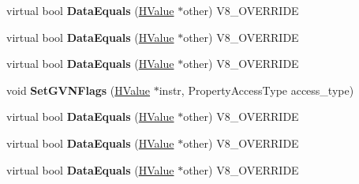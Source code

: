 \begin{DoxyCompactItemize}
\item 
\hypertarget{classv8_1_1internal_1_1_v8___f_i_n_a_l_a7f4d45af1c12067191189fb1f32db617}{}virtual bool {\bfseries Data\+Equals} (\hyperlink{classv8_1_1internal_1_1_h_value}{H\+Value} $\ast$other) V8\+\_\+\+O\+V\+E\+R\+R\+I\+D\+E\label{classv8_1_1internal_1_1_v8___f_i_n_a_l_a7f4d45af1c12067191189fb1f32db617}

\item 
\hypertarget{classv8_1_1internal_1_1_v8___f_i_n_a_l_a7f4d45af1c12067191189fb1f32db617}{}virtual bool {\bfseries Data\+Equals} (\hyperlink{classv8_1_1internal_1_1_h_value}{H\+Value} $\ast$other) V8\+\_\+\+O\+V\+E\+R\+R\+I\+D\+E\label{classv8_1_1internal_1_1_v8___f_i_n_a_l_a7f4d45af1c12067191189fb1f32db617}

\item 
\hypertarget{classv8_1_1internal_1_1_v8___f_i_n_a_l_a7f4d45af1c12067191189fb1f32db617}{}virtual bool {\bfseries Data\+Equals} (\hyperlink{classv8_1_1internal_1_1_h_value}{H\+Value} $\ast$other) V8\+\_\+\+O\+V\+E\+R\+R\+I\+D\+E\label{classv8_1_1internal_1_1_v8___f_i_n_a_l_a7f4d45af1c12067191189fb1f32db617}

\item 
\hypertarget{classv8_1_1internal_1_1_v8___f_i_n_a_l_a836c330c08c2da8553d00c083c9014cc}{}void {\bfseries Set\+G\+V\+N\+Flags} (\hyperlink{classv8_1_1internal_1_1_h_value}{H\+Value} $\ast$instr, Property\+Access\+Type access\+\_\+type)\label{classv8_1_1internal_1_1_v8___f_i_n_a_l_a836c330c08c2da8553d00c083c9014cc}

\item 
\hypertarget{classv8_1_1internal_1_1_v8___f_i_n_a_l_a7f4d45af1c12067191189fb1f32db617}{}virtual bool {\bfseries Data\+Equals} (\hyperlink{classv8_1_1internal_1_1_h_value}{H\+Value} $\ast$other) V8\+\_\+\+O\+V\+E\+R\+R\+I\+D\+E\label{classv8_1_1internal_1_1_v8___f_i_n_a_l_a7f4d45af1c12067191189fb1f32db617}

\item 
\hypertarget{classv8_1_1internal_1_1_v8___f_i_n_a_l_a7f4d45af1c12067191189fb1f32db617}{}virtual bool {\bfseries Data\+Equals} (\hyperlink{classv8_1_1internal_1_1_h_value}{H\+Value} $\ast$other) V8\+\_\+\+O\+V\+E\+R\+R\+I\+D\+E\label{classv8_1_1internal_1_1_v8___f_i_n_a_l_a7f4d45af1c12067191189fb1f32db617}

\item 
\hypertarget{classv8_1_1internal_1_1_v8___f_i_n_a_l_a7f4d45af1c12067191189fb1f32db617}{}virtual bool {\bfseries Data\+Equals} (\hyperlink{classv8_1_1internal_1_1_h_value}{H\+Value} $\ast$other) V8\+\_\+\+O\+V\+E\+R\+R\+I\+D\+E\label{classv8_1_1internal_1_1_v8___f_i_n_a_l_a7f4d45af1c12067191189fb1f32db617}


\end{DoxyCompactItemize}
